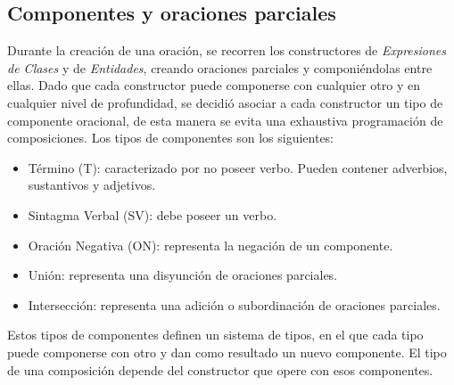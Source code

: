 \subsection{Componentes y oraciones parciales}
Durante la creación de una oración, se recorren los constructores de\textit{ Expresiones de Clases} y de \textit{Entidades}, creando oraciones parciales y componiéndolas entre ellas. Dado que cada constructor puede componerse con cualquier otro y en cualquier nivel de profundidad, se decidió asociar a cada constructor un tipo de componente oracional, de esta manera se evita una exhaustiva programación de composiciones.
Los tipos de componentes son los siguientes:
\begin{itemize}
    \item Término (T): caracterizado por no poseer verbo. Pueden contener adverbios, sustantivos y adjetivos.
    \item Sintagma Verbal (SV): debe poseer un verbo.
    \item Oración Negativa (ON): representa la negación de un componente.
    \item Unión: representa una disyunción de oraciones parciales.
    \item Intersección: representa una adición o subordinación de oraciones parciales.
\end{itemize}

Estos tipos de componentes definen un sistema de tipos, en el que cada tipo puede componerse con otro y dan como resultado un nuevo componente. El tipo de una composición depende del constructor que opere con esos componentes.

